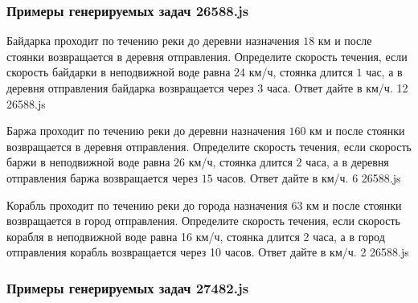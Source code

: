 
\subsubsection*{Примеры генерируемых задач 26588.js}   

\par{Байдарка проходит по течению реки до деревни назначения $18$ км и после стоянки возвращается в деревня отправления. Определите скорость течения, если скорость байдарки в неподвижной воде равна $24$ км/ч, стоянка длится $1$ час, а в деревня отправления байдарка возвращается через $3$ часа. Ответ дайте в км/ч. }{ 12 }{26588.js}
\par{Баржа проходит по течению реки до деревни назначения $160$ км и после стоянки возвращается в деревня отправления. Определите скорость течения, если скорость баржи в неподвижной воде равна $26$ км/ч, стоянка длится $2$ часа, а в деревня отправления баржа возвращается через $15$ часов. Ответ дайте в км/ч. }{ 6 }{26588.js}
\par{Корабль проходит по течению реки до города назначения 63 км и после стоянки возвращается в город отправления. Определите скорость течения, если скорость корабля в неподвижной воде равна 16 км/ч, стоянка длится 2 часа, а в город отправления корабль возвращается через 10 часов. Ответ дайте в км/ч. }{ 2 }{26588.js}


\subsubsection*{Примеры генерируемых задач 27482.js}   

